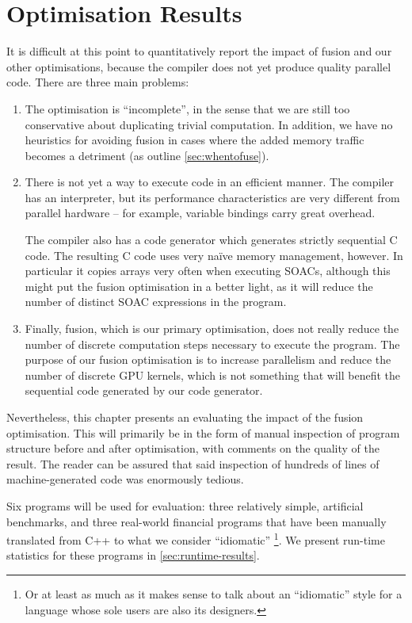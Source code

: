 \chapter{Optimisation Results}
\label{chap:optimisation-results}

It is difficult at this point to quantitatively report the impact of
fusion and our other optimisations, because the compiler does not yet
produce quality parallel code.  There are three main problems:

\begin{enumerate}
\item The optimisation is ``incomplete'', in the sense that we are
  still too conservative about duplicating trivial computation.  In
  addition, we have no heuristics for avoiding fusion in cases where
  the added memory traffic becomes a detriment (as outline
  \cref{sec:whentofuse}).

\item There is not yet a way to execute \LO{} code in an efficient
  manner.  The \LO{} compiler has an interpreter, but its performance
  characteristics are very different from parallel hardware -- for
  example, variable bindings carry great overhead.

  The compiler also has a code generator which generates strictly
  sequential C code.  The resulting C code uses very naïve memory
  management, however.  In particular it copies arrays very often when
  executing SOACs, although this might put the fusion optimisation in
  a better light, as it will reduce the number of distinct SOAC
  expressions in the program.

\item Finally, fusion, which is our primary optimisation, does not
  really reduce the number of discrete computation steps necessary to
  execute the program.  The purpose of our fusion optimisation is to
  increase parallelism and reduce the number of discrete GPU kernels,
  which is not something that will benefit the sequential code
  generated by our code generator.
\end{enumerate}

Nevertheless, this chapter presents an evaluating the impact of the
fusion optimisation.  This will primarily be in the form of manual
inspection of program structure before and after optimisation, with
comments on the quality of the result.  The reader can be assured that
said inspection of hundreds of lines of machine-generated code was
enormously tedious.

Six programs will be used for evaluation: three relatively simple,
artificial benchmarks, and three real-world financial programs that
have been manually translated from C++ to what we consider
``idiomatic'' \LO{}\footnote{Or at least as much as it makes sense to
  talk about an ``idiomatic'' style for a language whose sole users
  are also its designers.}.  We present run-time statistics for these
programs in \cref{sec:runtime-results}.

